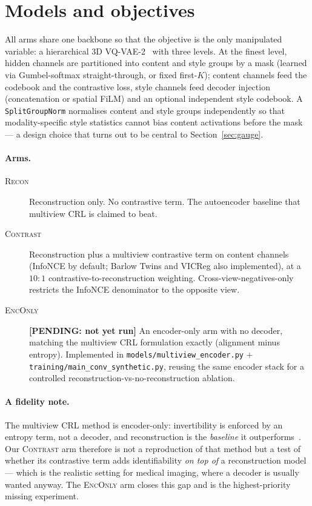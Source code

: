 \documentclass[11pt]{article}
\newcommand{\pending}[1]{{\color{red}\textbf{[PENDING: #1]}}}
\begin{document}
\section{Models and objectives}
\label{sec:models}

All arms share one backbone so that the objective is the only manipulated
variable: a hierarchical 3D VQ-VAE-2~\citep{razavi2019vqvae2} with three levels.
At the finest level, hidden channels are partitioned into content and style
groups by a mask (learned via Gumbel-softmax straight-through, or fixed
first-$K$); content channels feed the codebook and the contrastive loss, style
channels feed decoder injection (concatenation or spatial FiLM) and an optional
independent style codebook. A \texttt{SplitGroupNorm} normalises content and
style groups independently so that modality-specific style statistics cannot
bias content activations before the mask --- a design choice that turns out to
be central to Section~\ref{sec:gauge}.

\paragraph{Arms.}
\begin{description}
\item[\textsc{Recon}] Reconstruction only. No contrastive term. The autoencoder
baseline that multiview CRL is claimed to beat.
\item[\textsc{Contrast}] Reconstruction plus a multiview contrastive term on
content channels (InfoNCE by default; Barlow Twins and VICReg also implemented),
at a $10{:}1$ contrastive-to-reconstruction weighting. Cross-view-negatives-only
restricts the InfoNCE denominator to the opposite view.
\item[\textsc{EncOnly}] \pending{not yet run} An encoder-only arm with no
decoder, matching the multiview CRL formulation exactly (alignment minus
entropy). Implemented in \texttt{models/multiview\_encoder.py} +
\texttt{training/main\_conv\_synthetic.py}, reusing the same encoder stack for a
controlled reconstruction-vs-no-reconstruction ablation.
\end{description}

\paragraph{A fidelity note.} The multiview CRL method is encoder-only:
invertibility is enforced by an entropy term, not a decoder, and reconstruction
is the \emph{baseline} it outperforms~\citep{yao2024multiview}. Our
\textsc{Contrast} arm therefore is not a reproduction of that method but a test
of whether its contrastive term adds identifiability \emph{on top of} a
reconstruction model --- which is the realistic setting for medical imaging,
where a decoder is usually wanted anyway. The \textsc{EncOnly} arm closes this
gap and is the highest-priority missing experiment.
\end{document}
